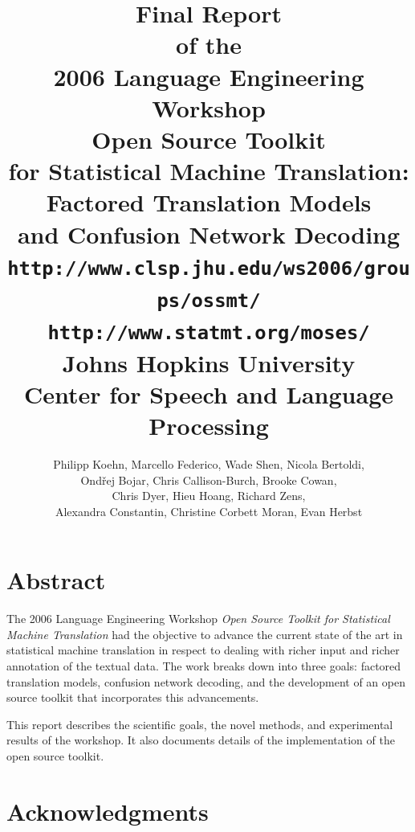\documentclass[11pt]{report}
\theoremstyle{plain}
\begin{document}
\title{\vspace{-25mm}\LARGE {\bf Final Report}\\[2mm]
of the\\[2mm]
2006 Language Engineering Workshop\\[15mm]
{\huge \bf Open Source Toolkit\\[2mm]
\bf for Statistical Machine Translation:\\[5mm]
Factored Translation Models\\[2mm]
and Confusion Network Decoding}\\[10mm]
{\tt \Large http://www.clsp.jhu.edu/ws2006/groups/ossmt/}\\[2mm]
{\tt \Large http://www.statmt.org/moses/}\\[15mm]
Johns Hopkins University\\[2mm]
Center for Speech and Language Processing}
\author{\large Philipp Koehn,
Marcello Federico,
Wade Shen,
Nicola Bertoldi,\\
\large Ond\v{r}ej Bojar,
Chris Callison-Burch,
Brooke Cowan,\\
\large Chris Dyer,
Hieu Hoang,
Richard Zens,\\
\large Alexandra Constantin,
Christine Corbett Moran,
Evan Herbst}

\maketitle
 
\section*{Abstract}
{\large The 2006 Language Engineering Workshop {\em Open Source Toolkit for Statistical Machine Translation} had the objective to advance the current state of the art in statistical machine translation in respect to dealing with richer input and richer annotation of the textual data. The work breaks down into three goals: factored translation models, confusion network decoding, and the development of an open source toolkit that incorporates this advancements.

This report describes the scientific goals, the novel methods, and experimental results of the workshop. It also documents details of the implementation of the open source toolkit.
}

\newpage
\section*{Acknowledgments}
\end{document}
